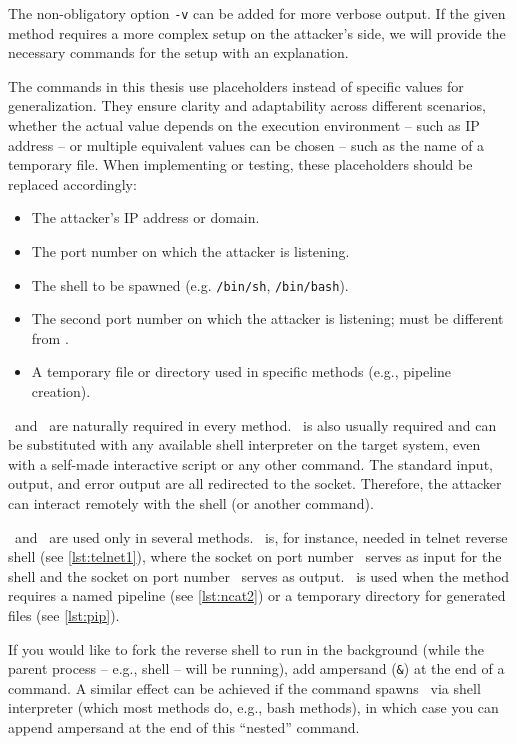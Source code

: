 The non-obligatory option \texttt{-v} can be added for more verbose output. If the given method requires a more complex setup on the attacker's side, we will provide the necessary commands for the setup with an explanation.

The commands in this thesis use placeholders instead of specific values for generalization. They ensure clarity and adaptability across different scenarios, whether the actual value depends on the execution environment -- such as IP address -- or multiple equivalent values can be chosen -- such as the name of a temporary file. When implementing or testing, these placeholders should be replaced accordingly:

\setlength{\leftmargini}{5em}
\begin{itemize}
\item[\host] The attacker's IP address or domain.
\item[\port] The port number on which the attacker is listening.
\item[\shell] The shell to be spawned (e.g. \texttt{/bin/sh}, \texttt{/bin/bash}).
\item[\portt] The second port number on which the attacker is listening; must be different from \port.
\item[\tmp] A temporary file or directory used in specific methods (e.g., pipeline creation).
\end{itemize}
\setlength{\leftmargini}{2.5em}

\host\ and \port\ are naturally required in every method. \shell\ is also usually required and can be substituted with any available shell interpreter on the target system, even with a self-made interactive script or any other command. The standard input, output, and error output are all redirected to the socket. Therefore, the attacker can interact remotely with the shell (or another command).

\portt\ and \tmp\ are used only in several methods. \portt\ is, for instance, needed in telnet reverse shell (see \cref{lst:telnet1}), where the socket on port number \port\ serves as input for the shell and the socket on port number \portt\ serves as output. \tmp\ is used when the method requires a named pipeline (see \cref{lst:ncat2}) or a temporary directory for generated files (see \cref{lst:pip}).

If you would like to fork the reverse shell to run in the background (while the parent process -- e.g., shell -- will be running), add ampersand (\texttt{\&}) at the end of a command. A similar effect can be achieved if the command spawns \shell\ via shell interpreter (which most methods do, e.g., bash methods), in which case you can append ampersand at the end of this ``nested'' command.


